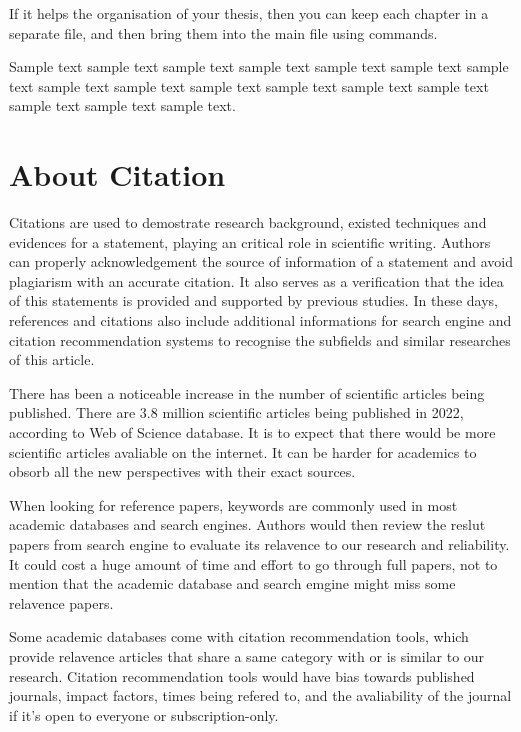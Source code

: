 If it helps the organisation of your thesis, then you can keep each
chapter in a separate file, and then bring them into the main 
file using \verb|| commands.

Sample text sample text sample text sample text sample text sample
text sample text sample text sample text sample text sample text
sample text sample text sample text sample text sample text.

\section{About Citation}
Citations are used to demostrate research background, existed techniques and evidences for a statement, playing an critical role in scientific writing.
Authors can properly acknowledgement the source of information of a statement and avoid plagiarism with an accurate citation.
It also serves as a verification that the idea of this statements is provided and supported by previous studies.
In these days, references and citations also include additional informations for search engine and citation recommendation systems to recognise the subfields and similar researches of this article.

There has been a noticeable increase in the number of scientific articles being published.
There are 3.8 million scientific articles being published in 2022, according to Web of Science database.
It is to expect that there would be more scientific articles avaliable on the internet.
It can be harder for academics to obsorb all the new perspectives with their exact sources.

When looking for reference papers, keywords are commonly used in most academic databases and search engines.
Authors would then review the reslut papers from search engine to evaluate its relavence to our research and reliability.
It could cost a huge amount of time and effort to go through full papers, not to mention that the academic database and search emgine might miss some relavence papers.

Some academic databases come with citation recommendation tools, which provide relavence articles that share a same category with or is similar to our research.
Citation recommendation tools would have bias towards published journals, impact factors, times being refered to, and the avaliability of the journal if it's open to everyone or subscription-only.